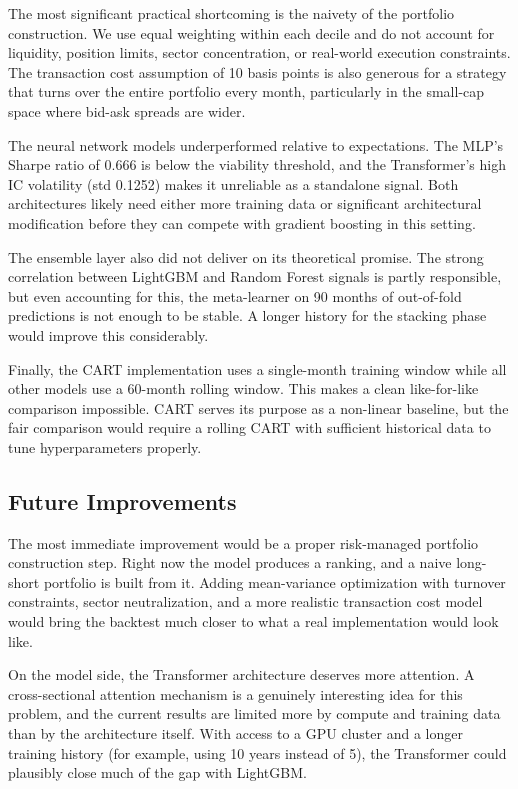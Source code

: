 \documentclass[11pt]{article}
\begin{document}
The most significant practical shortcoming is the naivety of the portfolio construction. We use equal weighting within each decile and do not account for liquidity, position limits, sector concentration, or real-world execution constraints. The transaction cost assumption of 10 basis points is also generous for a strategy that turns over the entire portfolio every month, particularly in the small-cap space where bid-ask spreads are wider.

The neural network models underperformed relative to expectations. The MLP's Sharpe ratio of 0.666 is below the viability threshold, and the Transformer's high IC volatility (std 0.1252) makes it unreliable as a standalone signal. Both architectures likely need either more training data or significant architectural modification before they can compete with gradient boosting in this setting.

The ensemble layer also did not deliver on its theoretical promise. The strong correlation between LightGBM and Random Forest signals is partly responsible, but even accounting for this, the meta-learner on 90 months of out-of-fold predictions is not enough to be stable. A longer history for the stacking phase would improve this considerably.

Finally, the CART implementation uses a single-month training window while all other models use a 60-month rolling window. This makes a clean like-for-like comparison impossible. CART serves its purpose as a non-linear baseline, but the fair comparison would require a rolling CART with sufficient historical data to tune hyperparameters properly.

\subsection{Future Improvements}

The most immediate improvement would be a proper risk-managed portfolio construction step. Right now the model produces a ranking, and a naive long-short portfolio is built from it. Adding mean-variance optimization with turnover constraints, sector neutralization, and a more realistic transaction cost model would bring the backtest much closer to what a real implementation would look like.

On the model side, the Transformer architecture deserves more attention. A cross-sectional attention mechanism is a genuinely interesting idea for this problem, and the current results are limited more by compute and training data than by the architecture itself. With access to a GPU cluster and a longer training history (for example, using 10 years instead of 5), the Transformer could plausibly close much of the gap with LightGBM.
\end{document}
